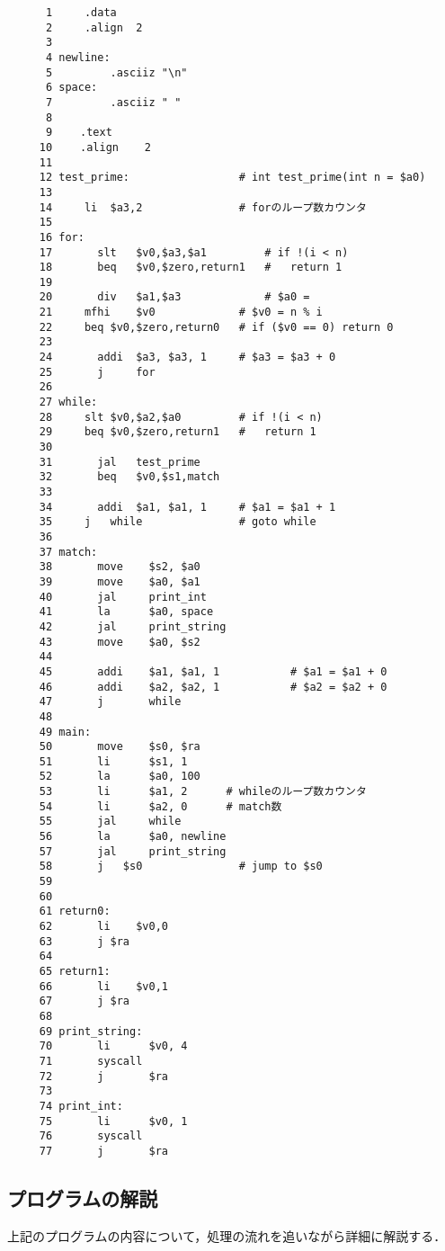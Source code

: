 \documentclass[a4j,11pt]{jarticle}
\begin{document}
\begin{verbatim}
      1	    .data
      2	    .align  2
      3	
      4	newline:
      5	        .asciiz "\n"
      6	space:
      7	        .asciiz " "
      8	
      9	　　.text
     10	　　.align	2
     11	
     12	test_prime:				    # int test_prime(int n = $a0)
     13	
     14		li	$a3,2			    # forのループ数カウンタ
     15	
     16	for:
     17	      slt	$v0,$a3,$a1	        # if !(i < n)
     18	      beq	$v0,$zero,return1	#   return 1
     19	
     20	      div	$a1,$a3			    # $a0 = 
     21		mfhi	$v0			    # $v0 = n % i
     22		beq	$v0,$zero,return0	# if ($v0 == 0) return 0
     23	
     24	      addi	$a3, $a3, 1		# $a3 = $a3 + 0
     25	      j     for
     26	
     27	while:
     28		slt	$v0,$a2,$a0		    # if !(i < n)
     29		beq	$v0,$zero,return1	#   return 1
     30	
     31	      jal   test_prime
     32	      beq   $v0,$s1,match
     33	
     34	      addi	$a1, $a1, 1		# $a1 = $a1 + 1
     35		j	while			    # goto while
     36	
     37	match: 
     38	      move    $s2, $a0
     39	      move    $a0, $a1
     40	      jal     print_int
     41	      la      $a0, space
     42	      jal     print_string
     43	      move    $a0, $s2
     44	
     45	      addi	  $a1, $a1, 1			# $a1 = $a1 + 0
     46	      addi	  $a2, $a2, 1			# $a2 = $a2 + 0
     47	      j       while
     48	
     49	main:
     50	      move    $s0, $ra
     51	      li      $s1, 1
     52	      la      $a0, 100 
     53	      li      $a1, 2      # whileのループ数カウンタ
     54	      li      $a2, 0      # match数
     55	      jal     while
     56	      la      $a0, newline
     57	      jal     print_string
     58	      j	  $s0				# jump to $s0
     59	
     60	
     61	return0:
     62	      li	$v0,0
     63	      j	$ra
     64	
     65	return1:
     66	      li	$v0,1
     67	      j	$ra
     68	
     69	print_string:
     70	      li      $v0, 4
     71	      syscall
     72	      j       $ra
     73	
     74	print_int:
     75	      li      $v0, 1
     76	      syscall
     77	      j       $ra
\end{verbatim}

\subsection{プログラムの解説}
上記のプログラムの内容について，処理の流れを追いながら詳細に解説する．
\end{document}

